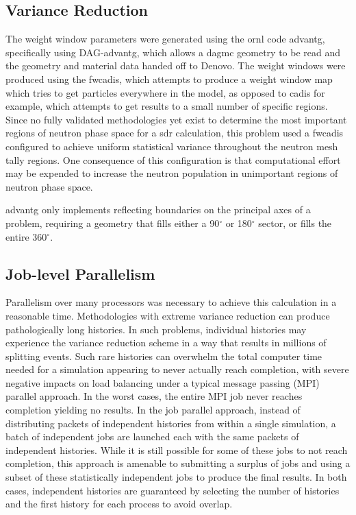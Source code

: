\documentclass[12pt]{article}
\begin{document}
\subsection{Variance Reduction}
The weight window parameters were generated using the \gls{ornl} code
\gls{advantg}, specifically using DAG-\gls{advantg}, which allows a
\gls{dagmc} geometry to be read and the geometry and material data handed off to
Denovo. The weight windows were produced using the \gls{fwcadis},
which attempts to produce a weight window map which tries to get particles
everywhere in the model, as opposed to \gls{cadis} for example, which
attempts to get results to a small number of specific regions.  Since no 
fully validated methodologies yet exist to determine the most important regions of
neutron phase space for a \gls{sdr} calculation, this problem used a \gls{fwcadis}
configured to achieve uniform statistical variance throughout the neutron mesh
tally regions.  One consequence of this configuration is that computational
effort may be expended to increase the neutron population in unimportant regions 
of neutron phase space.

\gls{advantg} only implements reflecting boundaries on the principal axes of a 
problem, requiring a geometry that fills either a 90$^{\circ}$ or 180$^{\circ}$ 
sector, or fills the entire 360$^{\circ}$.


\subsection{Job-level Parallelism}

Parallelism over many processors was necessary to achieve this calculation in
a reasonable time. Methodologies with extreme variance reduction can produce
pathologically long histories.  In such problems, individual histories may
experience the variance reduction scheme in a way that results in millions of
splitting events.  Such rare histories can overwhelm the total computer time
needed for a simulation appearing to never actually reach completion, with
severe negative impacts on load balancing under a typical message passing
(MPI) parallel approach.  In the worst cases, the entire MPI job never reaches
completion yielding no results.  In the job parallel approach, instead of
distributing packets of independent histories from within a single simulation,
a batch of independent jobs are launched each with the same packets of
independent histories.  While it is still possible for some of these jobs to
not reach completion, this approach is amenable to submitting a surplus of
jobs and using a subset of these statistically independent jobs to produce the
final results.  In both cases, independent histories are guaranteed by
selecting the number of histories and the first history for each process to
avoid overlap.  
\end{document}
